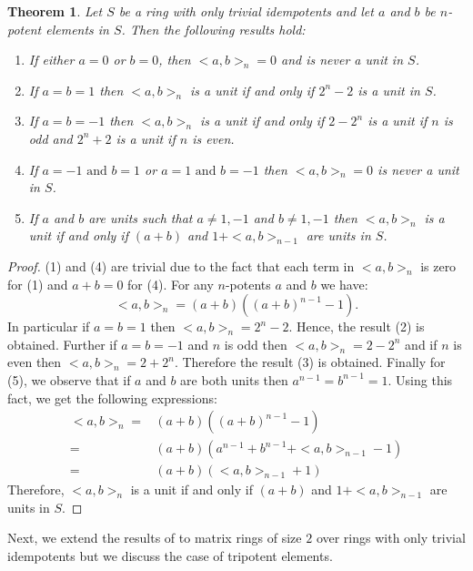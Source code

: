 \documentclass[12pt]{amsart}
\newtheorem{theorem}{Theorem}[section]
\theoremstyle{definition}
\numberwithin{equation}{section}
\begin{document}
\begin{theorem}\label{THM: Commutators and Anticommutators in Rings with only trivial idempotents}
   Let $S$ be a ring with only trivial idempotents and let $a$ and $b$ be $n$-potent elements in $S$. Then the following results hold:
   \begin{enumerate}
       \item If either $a=0$ or $b=0$, then $<a,b>_n=0$ and is never a unit in $S$.
       \item If $a=b=1$ then $<a,b>_n$ is a unit if and only if $2^n-2$ is a unit in $S$. 
       \item If $a=b=-1$ then $<a,b>_n$ is a unit if and only if $2-2^n$ is a unit if $n$ is odd and $2^n+2$ is a unit if $n$ is even. 
       \item If $a=-1 \text{ and }b=1$ or  $a=1 \text{ and }b=-1$ then $<a,b>_n=0$ is never a unit in $S$.
       \item If $a$ and $b$ are units such that $a\neq 1,-1$ and $b \neq 1,-1$ then $<a,b>_n$ is a unit if and only if $(a+b)$ and $1+<a,b>_{n-1}$ are units in $S$. 
   \end{enumerate}
\end{theorem}
\begin{proof}
    (1) and (4) are trivial due to the fact that each term in $<a,b>_n$ is zero for (1) and $a+b=0$ for (4). For any $n$-potents $a $ and $b$ we have:
    $$<a,b>_n=(a+b)((a+b)^{n-1}-1).$$
    In particular if $a=b=1$ then $<a,b>_n=2^n-2$. Hence, the result (2) is obtained. Further if $a=b=-1$ and $n$ is odd then $<a,b>_n=2-2^n$ and if $n$ is even then $<a,b>_n=2+2^n$. Therefore the result (3) is obtained. Finally for (5), we observe that if $a$ and $b$ are both units then $a^{n-1}=b^{n-1}=1$. Using this fact, we get the following expressions:
    \begin{align*}
        <a,b>_n=&(a+b)((a+b)^{n-1}-1)\\
        =& (a+b)(a^{n-1}+b^{n-1}+<a,b>_{n-1}-1)\\
        =&(a+b)(<a,b>_{n-1}+1)        
    \end{align*}
Therefore, $<a,b>_n$ is a unit if and only if $(a+b)$ and $1+<a,b>_{n-1}$ are units in $S$.
\end{proof}
Next, we extend the results of  to matrix rings of size $2$ over rings with only trivial idempotents but we discuss the case of tripotent elements.  
\end{document}
